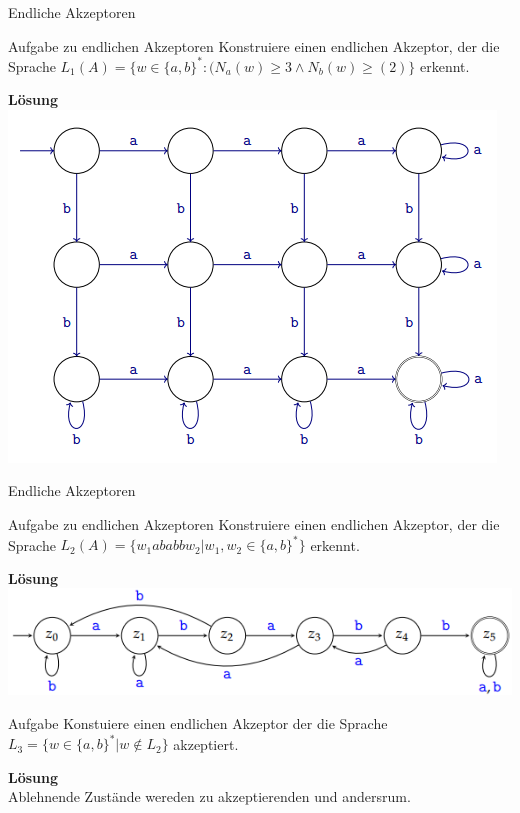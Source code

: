 \documentclass[handout]{beamer}
\begin{document}
\begin{frame}{Endliche Akzeptoren}
	\begin{taskblock}{Aufgabe zu endlichen Akzeptoren}
		Konstruiere einen endlichen Akzeptor, der die Sprache $L_1(A) = \{w \in \{a,b\}^* : (N_a(w) \geq 3 \land N_b(w) \geq(2)\}$ erkennt.
	\end{taskblock}
	
	\pause
	\textbf{Lösung}\\
	\includegraphics[scale=0.6]{images/AufgAkzeptor2.png}
\end{frame}
		
		

\begin{frame}{Endliche Akzeptoren}
	\begin{taskblock}{Aufgabe zu endlichen Akzeptoren}
		Konstruiere einen endlichen Akzeptor, der die Sprache $L_2(A) = \{w_1 ababb w_2| w_1, w_2 \in \{a,b\}^*\}$ erkennt.
	\end{taskblock}
	
	\pause
	\textbf{Lösung}\\
	\includegraphics[scale=0.7]{images/AufgAkzeptor.png}\\
	\pause
	\begin{taskblock}{Aufgabe}
		Konstuiere einen endlichen Akzeptor der die Sprache $L_3 =\{w \in \{a,b\}^*| w \not \in L_2\}$ akzeptiert.
	\end{taskblock}
	\pause
	\textbf{Lösung} \\Ablehnende Zustände wereden zu akzeptierenden und andersrum.
\end{frame}		 
\end{document}
